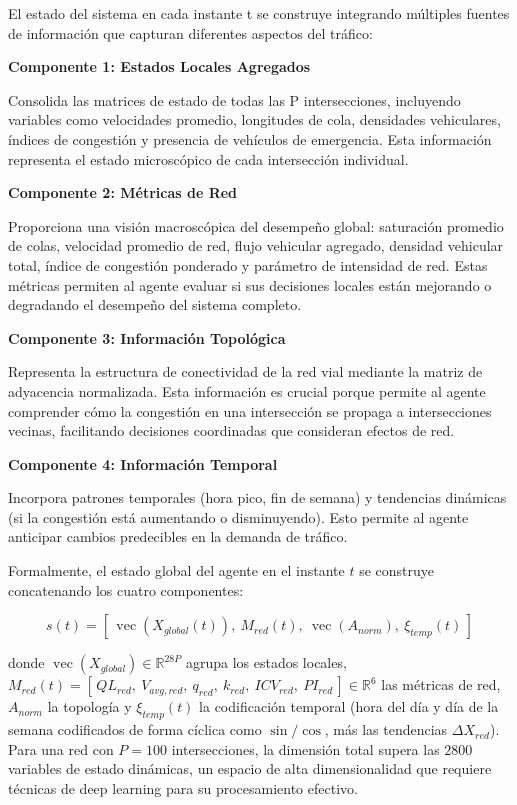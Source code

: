 \documentclass[12pt,a4paper,oneside]{report}
\begin{document}
El estado del sistema en cada instante t se construye integrando múltiples fuentes de información que capturan diferentes aspectos del tráfico:

\textbf{Componente 1: Estados Locales Agregados}

Consolida las matrices de estado de todas las P intersecciones, incluyendo variables como velocidades promedio, longitudes de cola, densidades vehiculares, índices de congestión y presencia de vehículos de emergencia. Esta información representa el estado microscópico de cada intersección individual.

\textbf{Componente 2: Métricas de Red}

Proporciona una visión macroscópica del desempeño global: saturación promedio de colas, velocidad promedio de red, flujo vehicular agregado, densidad vehicular total, índice de congestión ponderado y parámetro de intensidad de red. Estas métricas permiten al agente evaluar si sus decisiones locales están mejorando o degradando el desempeño del sistema completo.

\textbf{Componente 3: Información Topológica}

Representa la estructura de conectividad de la red vial mediante la matriz de adyacencia normalizada. Esta información es crucial porque permite al agente comprender cómo la congestión en una intersección se propaga a intersecciones vecinas, facilitando decisiones coordinadas que consideran efectos de red.

\textbf{Componente 4: Información Temporal}

Incorpora patrones temporales (hora pico, fin de semana) y tendencias dinámicas (si la congestión está aumentando o disminuyendo). Esto permite al agente anticipar cambios predecibles en la demanda de tráfico.

Formalmente, el estado global del agente en el instante \(t\) se construye concatenando los cuatro componentes:

\begin{equation}
s(t) = \left[\, \operatorname{vec}\!\left(X_{global}(t)\right),\ M_{red}(t),\ \operatorname{vec}\!\left(A_{norm}\right),\ \xi_{temp}(t) \,\right]
\label{eq:estado}
\end{equation}

donde \(\operatorname{vec}(X_{global}) \in \mathbb{R}^{28P}\) agrupa los estados locales, \(M_{red}(t) = [\,QL_{red},\ V_{avg,red},\ q_{red},\ k_{red},\ ICV_{red},\ PI_{red}\,] \in \mathbb{R}^{6}\) las métricas de red, \(A_{norm}\) la topología y \(\xi_{temp}(t)\) la codificación temporal (hora del día y día de la semana codificados de forma cíclica como \(\sin/\cos\), más las tendencias \(\Delta X_{red}\)). Para una red con \(P = 100\) intersecciones, la dimensión total supera las \(2800\) variables de estado dinámicas, un espacio de alta dimensionalidad que requiere técnicas de deep learning para su procesamiento efectivo.
\end{document}
